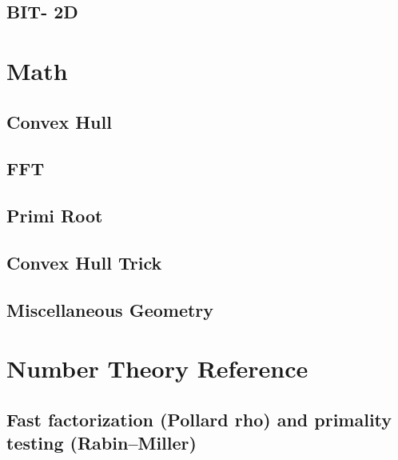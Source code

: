 \documentclass[12pt]{extarticle}
\begin{document}
\begin{multicols*}{2}
\subsection{BIT- 2D} %



\section{Math}

\subsection{Convex Hull} %


\subsection{FFT} %


\subsection{Primi Root } %


\subsection{Convex Hull Trick} %



\subsection{Miscellaneous Geometry} %


% 

\section{Number Theory Reference}

\subsection{Fast factorization (Pollard rho) and primality testing
(Rabin--Miller)} %



\end{multicols*}
\end{document}
